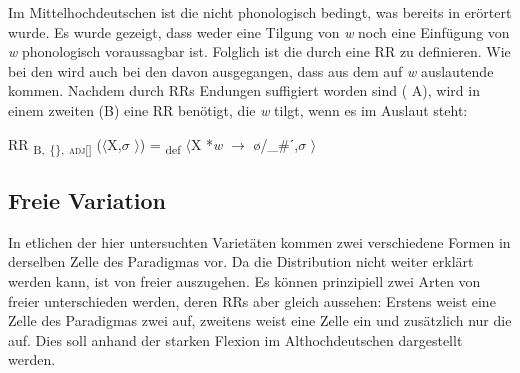 
\begin{table}
\caption{ Wa-/w\=o-Stämme im Althochdeutschen am Beispiel der Lexeme \textit{garo} ‘bereit’ und \textit{blint} ‘blind’ \citep[220, 225]{Braune2004}}\label{table5.16}
\end{table}

Im Mittelhochdeutschen ist die  nicht phonologisch bedingt, was bereits in  erörtert wurde. Es wurde gezeigt, dass weder eine Tilgung von \textit{w} noch eine Einfügung von \textit{w} phonologisch voraussagbar ist. Folglich ist die  durch eine RR zu definieren. Wie bei den  wird auch bei den  davon ausgegangen, dass aus dem  auf \textit{w} auslautende  kommen. Nachdem durch RRs Endungen suffigiert worden sind ( A), wird in einem zweiten  (B) eine RR benötigt, die \textit{w} tilgt, wenn es im Auslaut steht:

\ea%
\label{ex:key:97}
 RR \textsubscript{B,} \textsubscript{\{\},} \textsubscript{\textsc{adj[]}} ($\langle$X,$\sigma$ $\rangle$) = \textsubscript{def} $\langle$X *\textit{w} $\rightarrow$ ø/\_\#ˊ,$\sigma$ $\rangle$\\
\z

\subsection{Freie Variation}\label{5.2.3}

In etlichen der hier untersuchten Varietäten kommen zwei verschiedene Formen in derselben Zelle des Paradigmas vor. Da die Distribution nicht weiter erklärt werden kann, ist von freier  auszugehen. Es können prinzipiell zwei Arten von freier  unterschieden werden, deren RRs aber gleich aussehen: Erstens weist eine Zelle des Paradigmas zwei  auf, zweitens weist eine Zelle ein  und zusätzlich nur die  auf. Dies soll anhand der starken Flexion im Althochdeutschen dargestellt werden.

